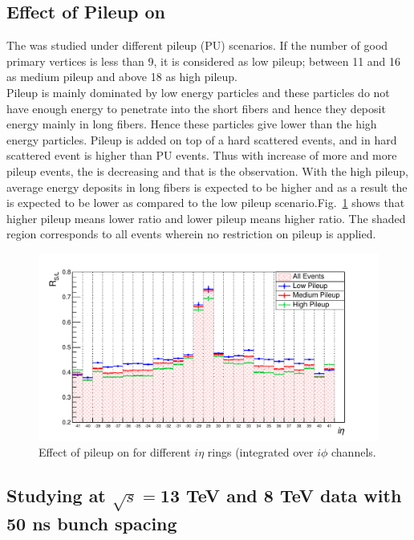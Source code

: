 \begin{itemize}
\subsection{Effect of Pileup on \ratiosl}\label{pileup}
The \ratiosl was studied under different pileup (PU) scenarios. If the number 
of good primary vertices is less than 9, it is considered as low pileup; 
between 11 and 16 as medium pileup and above 18 as high pileup.\\
Pileup is mainly dominated by low energy particles
and these particles do not have enough energy to penetrate into the short fibers and hence they deposit energy mainly in long fibers.
Hence these particles give lower \ratiosl than the high energy particles. Pileup is added on top of
a hard scattered events, and in hard scattered event \ratiosl is higher than PU events. Thus 
with increase of more and more pileup events, the \ratiosl is decreasing and that is the observation. With the high pileup, average energy deposits in long fibers is expected 
to be higher and as a result the \ratiosl is expected to be lower as 
compared to the low pileup scenario.Fig.~\ref{RvsIetaComparePileups} shows 
that higher pileup means lower ratio and lower pileup means higher ratio. 
The shaded region corresponds to all events wherein no restriction on pileup is 
applied.

\begin{figure}[h!]
\centering
\includegraphics[width=0.7\linewidth]{../Figures/Chap2/ImageFiles_HF/Ratio/RvsIetaComparePileups.pdf}
\captionsetup{width=.9\linewidth}
\caption{Effect of pileup on \ratiosl for different $i\eta$ rings (integrated over $i\phi$ channels.}
\label{RvsIetaComparePileups}
\end{figure}

\end{itemize}


\subsection{Studying \ratiosl at $\sqrt{s}=$13 TeV and 8 TeV data with 50 ns bunch spacing}\label{sec:ana50ns}

